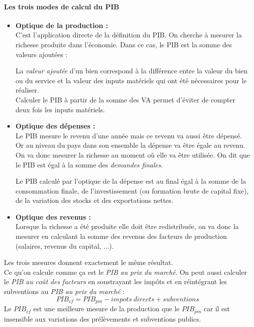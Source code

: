 \documentclass[10pt]{book}
\begin{document}
\paragraph{Les trois modes de calcul du PIB} 
\begin{itemize}
  \item \textbf{Optique de la production :} \\
    C'est l'application directe de la définition du PIB. On cherche à mesurer la richesse produite dans l'économie. Dans ce cas, le PIB est la somme des valeurs ajoutées :    
    \begin{center}
    \end{center}
    La \textit{valeur ajoutée} d'un bien correspond à la différence entre la valeur du bien ou du service et la valeur des inputs matériels qui ont été nécessaires pour le réaliser. \\
    Calculer le PIB à partir de la somme des VA permet d'éviter de compter deux fois les inputs matériels.
  \item \textbf{Optique des dépenses :} \\
    Le PIB mesure le revenu d'une année mais ce revenu va aussi être dépensé. Or au niveau du pays dans son ensemble la dépense va être égale au revenu. On va donc mesurer la richesse au moment où elle va être utilisée. On dit que le PIB est égal à la somme des \textit{demandes finales}. 
    \begin{center}
    \end{center}
    Le PIB calculé par l'optique de la dépense est au final égal à la somme de la consommation finale, de l'investissement (ou formation brute de capital fixe), de la variation des stocks et des exportations nettes.
  \item \textbf{Optique des revenus :} \\
    Lorsque la richesse a été produite elle doit être redistribuée, on va donc la mesurer en calculant la somme des revenus des facteurs de production (salaires, revenus du capital, ...).  
    \begin{center}
    \end{center}
\end{itemize}
Les trois mesures donnent exactement le même résultat. \\
Ce qu'on calcule comme ça est le \textit{PIB au prix du marché}. On peut aussi calculer le \textit{PIB au coût des facteurs} en soustrayant les impôts et en réintégrant les subventions au \textit{PIB au prix du marché} :
$$PIB_{cf} = PIB_{pm} - impots~directs + subventions$$
Le $PIB_{cf}$ est une meilleure mesure de la production que le $PIB_{pm}$ car il est insensible aux variations des prélèvements et subventions publics. 
\end{document}
